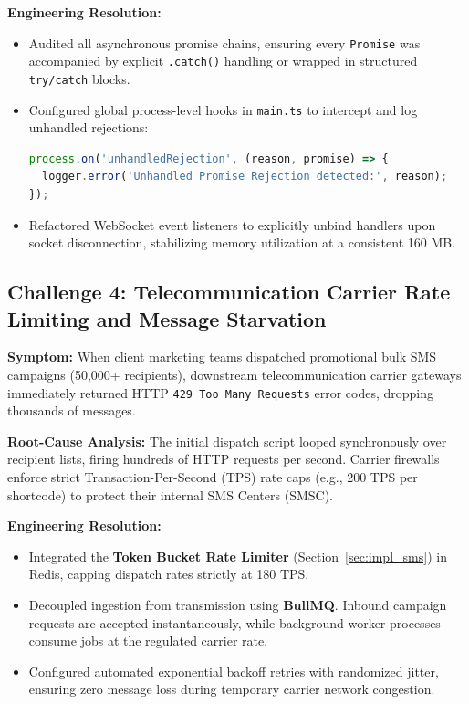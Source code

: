 \textbf{Engineering Resolution:}
\begin{itemize}
    \item Audited all asynchronous promise chains, ensuring every \texttt{Promise} was accompanied by explicit \texttt{.catch()} handling or wrapped in structured \texttt{try/catch} blocks.
    \item Configured global process-level hooks in \texttt{main.ts} to intercept and log unhandled rejections:
    \begin{lstlisting}[language=JavaScript]
process.on('unhandledRejection', (reason, promise) => {
  logger.error('Unhandled Promise Rejection detected:', reason);
});
    \end{lstlisting}
    \item Refactored WebSocket event listeners to explicitly unbind handlers upon socket disconnection, stabilizing memory utilization at a consistent 160 MB.
\end{itemize}

\subsection{Challenge 4: Telecommunication Carrier Rate Limiting and Message Starvation}
\textbf{Symptom:} When client marketing teams dispatched promotional bulk SMS campaigns (50,000+ recipients), downstream telecommunication carrier gateways immediately returned HTTP \texttt{429 Too Many Requests} error codes, dropping thousands of messages.

\textbf{Root-Cause Analysis:} The initial dispatch script looped synchronously over recipient lists, firing hundreds of HTTP requests per second. Carrier firewalls enforce strict Transaction-Per-Second (TPS) rate caps (e.g., 200 TPS per shortcode) to protect their internal SMS Centers (SMSC).

\textbf{Engineering Resolution:}
\begin{itemize}
    \item Integrated the \textbf{Token Bucket Rate Limiter} (Section~\ref{sec:impl_sms}) in Redis, capping dispatch rates strictly at 180 TPS.
    \item Decoupled ingestion from transmission using \textbf{BullMQ}. Inbound campaign requests are accepted instantaneously, while background worker processes consume jobs at the regulated carrier rate.
    \item Configured automated exponential backoff retries with randomized jitter, ensuring zero message loss during temporary carrier network congestion.
\end{itemize}

